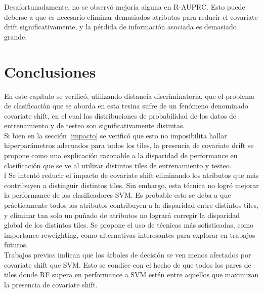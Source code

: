 Desafortunadamente, no se observó mejoría alguna en R-AUPRC. Esto puede deberse a que es necesario eliminar demasiados atributos para reducir el covariate drift significativamente, y la pérdida de información asociada es demasiado grande. 


\section{Conclusiones}

En este capítulo se verificó, utilizando distancia discriminatoria, que el problema de clasificación que se aborda en esta tesina sufre de un fenómeno denominado covariate shift, en el cual las distribuciones de probabilidad de los datos de entrenamiento y de testeo son significativamente distintas. \\

Si bien en la sección \ref{impacto} se verificó que esto no imposibilita hallar hiperparámetros adecuados para todos los tiles, la presencia de covariate drift se propone como una explicación razonable a la disparidad de performance en clasificación que se ve al utilizar distintos tiles de entrenamiento y testeo. \\
f
Se intentó reducir el impacto de covariate shift eliminando los atributos que más contribuyen a distinguir distintos tiles. Sin embargo, esta técnica no logró mejorar la performance de los clasificadores SVM. Es probable esto se deba a que prácticamente todos los atributos contribuyen a la disparidad entre distintos tiles, y eliminar tan solo un puñado de atributos no logrará corregir la disparidad global de los distintos tiles. Se propone el uso de técnicas más sofisticadas, como importance reweighting, como alternativas interesantes para explorar en trabajos futuros. \\

Trabajos previos indican que los árboles de decisión se ven menos afectados por covariate shift que SVM. Esto se condice con el hecho de que todos los pares de tiles donde RF supera en performance a SVM estén entre aquellos que maximizan la presencia de covariate shift.
